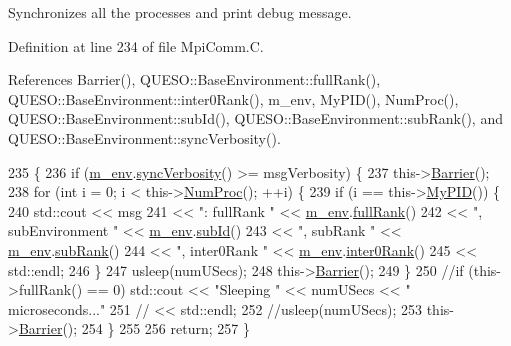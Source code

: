 Synchronizes all the processes and print debug message. 



Definition at line 234 of file Mpi\-Comm.\-C.



References Barrier(), Q\-U\-E\-S\-O\-::\-Base\-Environment\-::full\-Rank(), Q\-U\-E\-S\-O\-::\-Base\-Environment\-::inter0\-Rank(), m\-\_\-env, My\-P\-I\-D(), Num\-Proc(), Q\-U\-E\-S\-O\-::\-Base\-Environment\-::sub\-Id(), Q\-U\-E\-S\-O\-::\-Base\-Environment\-::sub\-Rank(), and Q\-U\-E\-S\-O\-::\-Base\-Environment\-::sync\-Verbosity().


\begin{DoxyCode}
235 \{
236   \textcolor{keywordflow}{if} (\hyperlink{class_q_u_e_s_o_1_1_mpi_comm_a6b63af09a9b80f14b25409bc561abb41}{m\_env}.\hyperlink{class_q_u_e_s_o_1_1_base_environment_a70df256cd4d968e426175a38269c04d5}{syncVerbosity}() >= msgVerbosity) \{
237     this->\hyperlink{class_q_u_e_s_o_1_1_mpi_comm_a4059971c30e023b272fccaa6aa00c426}{Barrier}();
238     \textcolor{keywordflow}{for} (\textcolor{keywordtype}{int} i = 0; i < this->\hyperlink{class_q_u_e_s_o_1_1_mpi_comm_aa780721ae0fdeabc5a15e04cb0cad964}{NumProc}(); ++i) \{
239       \textcolor{keywordflow}{if} (i == this->\hyperlink{class_q_u_e_s_o_1_1_mpi_comm_ab806f80f206210723fcb4df8185a55a8}{MyPID}()) \{
240         std::cout << msg
241                   << \textcolor{stringliteral}{": fullRank "}       << \hyperlink{class_q_u_e_s_o_1_1_mpi_comm_a6b63af09a9b80f14b25409bc561abb41}{m\_env}.\hyperlink{class_q_u_e_s_o_1_1_base_environment_a84a239e42ae443cf71db6e03e8159620}{fullRank}()
242                   << \textcolor{stringliteral}{", subEnvironment "} << \hyperlink{class_q_u_e_s_o_1_1_mpi_comm_a6b63af09a9b80f14b25409bc561abb41}{m\_env}.\hyperlink{class_q_u_e_s_o_1_1_base_environment_a6ae3174897a9b3a4c85fa18da5d4c16f}{subId}()
243                   << \textcolor{stringliteral}{", subRank "}        << \hyperlink{class_q_u_e_s_o_1_1_mpi_comm_a6b63af09a9b80f14b25409bc561abb41}{m\_env}.\hyperlink{class_q_u_e_s_o_1_1_base_environment_a172d52f993f1322ed45aaddf71518dbb}{subRank}()
244                   << \textcolor{stringliteral}{", inter0Rank "}     << \hyperlink{class_q_u_e_s_o_1_1_mpi_comm_a6b63af09a9b80f14b25409bc561abb41}{m\_env}.\hyperlink{class_q_u_e_s_o_1_1_base_environment_ae106b5bb8a80b655b88b3a26b1e7c185}{inter0Rank}()
245                   << std::endl;
246       \}
247       usleep(numUSecs);
248       this->\hyperlink{class_q_u_e_s_o_1_1_mpi_comm_a4059971c30e023b272fccaa6aa00c426}{Barrier}();
249     \}
250     \textcolor{comment}{//if (this->fullRank() == 0) std::cout << "Sleeping " << numUSecs << " microseconds..."}
251     \textcolor{comment}{//                                     << std::endl;}
252     \textcolor{comment}{//usleep(numUSecs);}
253     this->\hyperlink{class_q_u_e_s_o_1_1_mpi_comm_a4059971c30e023b272fccaa6aa00c426}{Barrier}();
254   \}
255 
256   \textcolor{keywordflow}{return};
257 \}
\end{DoxyCode}


